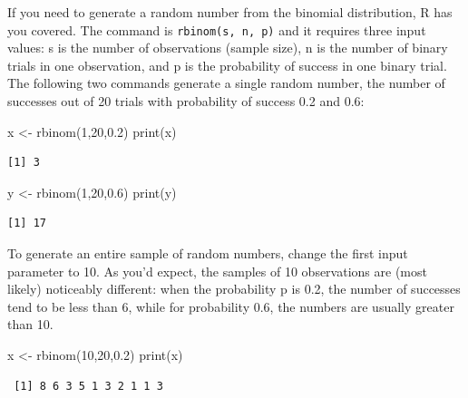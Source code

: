 \documentclass[
  letterpaper,
  DIV=11,
  numbers=noendperiod]{scrreprt}
\newenvironment{Shaded}{\begin{snugshade}}{\end{snugshade}}
\newcommand{\DecValTok}[1]{\textcolor[rgb]{0.68,0.00,0.00}{#1}}
\newcommand{\FloatTok}[1]{\textcolor[rgb]{0.68,0.00,0.00}{#1}}
\newcommand{\FunctionTok}[1]{\textcolor[rgb]{0.28,0.35,0.67}{#1}}
\newcommand{\NormalTok}[1]{\textcolor[rgb]{0.00,0.23,0.31}{#1}}
\newcommand{\OtherTok}[1]{\textcolor[rgb]{0.00,0.23,0.31}{#1}}
\begin{document}
If you need to generate a random number from the binomial distribution,
R has you covered. The command is \texttt{rbinom(s,\ n,\ p)} and it
requires three input values: s is the number of observations (sample
size), n is the number of binary trials in one observation, and p is the
probability of success in one binary trial. The following two commands
generate a single random number, the number of successes out of 20
trials with probability of success 0.2 and 0.6:

\begin{Shaded}
\begin{Highlighting}[]
\NormalTok{x }\OtherTok{\textless{}{-}} \FunctionTok{rbinom}\NormalTok{(}\DecValTok{1}\NormalTok{,}\DecValTok{20}\NormalTok{,}\FloatTok{0.2}\NormalTok{)}
\FunctionTok{print}\NormalTok{(x)}
\end{Highlighting}
\end{Shaded}

\begin{verbatim}
[1] 3
\end{verbatim}

\begin{Shaded}
\begin{Highlighting}[]
\NormalTok{y }\OtherTok{\textless{}{-}} \FunctionTok{rbinom}\NormalTok{(}\DecValTok{1}\NormalTok{,}\DecValTok{20}\NormalTok{,}\FloatTok{0.6}\NormalTok{)}
\FunctionTok{print}\NormalTok{(y)}
\end{Highlighting}
\end{Shaded}

\begin{verbatim}
[1] 17
\end{verbatim}

To generate an entire sample of random numbers, change the first input
parameter to 10. As you'd expect, the samples of 10 observations are
(most likely) noticeably different: when the probability p is 0.2, the
number of successes tend to be less than 6, while for probability 0.6,
the numbers are usually greater than 10.

\begin{Shaded}
\begin{Highlighting}[]
\NormalTok{x }\OtherTok{\textless{}{-}} \FunctionTok{rbinom}\NormalTok{(}\DecValTok{10}\NormalTok{,}\DecValTok{20}\NormalTok{,}\FloatTok{0.2}\NormalTok{)}
\FunctionTok{print}\NormalTok{(x)}
\end{Highlighting}
\end{Shaded}

\begin{verbatim}
 [1] 8 6 3 5 1 3 2 1 1 3
\end{verbatim}
\end{document}
